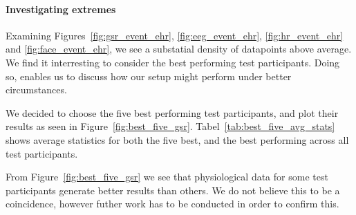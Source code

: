 \paragraph{Investigating extremes}
Examining Figures~\ref{fig:gsr_event_ehr}, \ref{fig:eeg_event_ehr}, \ref{fig:hr_event_ehr} and \ref{fig:face_event_ehr},
we see a substatial density of datapoints above average. We find it interresting to consider the best performing test
participants. Doing so, enables us to discuss how our setup might perform under better circumstances.




We decided to choose the five best performing test participants, and plot their results as seen in
Figure~\ref{fig:best_five_gsr}. Tabel~\ref{tab:best_five_avg_stats} shows average statistics for both the five best, and
the best performing across all test participants.

From Figure~\ref{fig:best_five_gsr} we see that physiological data for some test participants generate better results
than others. We do not believe this to be a coincidence, however futher work has to be conducted in order to confirm this.